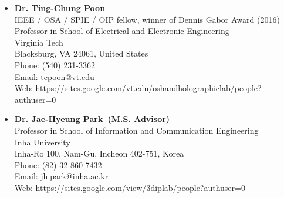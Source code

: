 \documentclass[10pt,a4paper]{moderncv}
\begin{document}
\begin{itemize}
\item \textbf{Dr. Ting-Chung Poon} \\
    IEEE / OSA / SPIE / OIP fellow, winner of Dennis Gabor Award (2016) \\
    Professor in School of Electrical and Electronic Engineering \\
    Virginia Tech \\
    Blacksburg, VA 24061, United States \\
    Phone: (540) 231-3362 \\
    Email: tcpoon@vt.edu  \\
    Web: {https://sites.google.com/vt.edu/oshandholographiclab/people?authuser=0}
\end{itemize} 
\vspace{6pt}

\begin{itemize}
\item \textbf{Dr. Jae-Hyeung Park~(M.S. Advisor)}\\
    Professor in School of Information and Communication Engineering\\
    Inha University\\
    Inha-Ro 100, Nam-Gu, Incheon 402-751, Korea\\
    Phone: (82) 32-860-7432 \\
    Email: jh.park@inha.ac.kr \\
    Web: {https://sites.google.com/view/3diplab/people?authuser=0}
\end{itemize}
\vspace{6pt}





\end{document}
